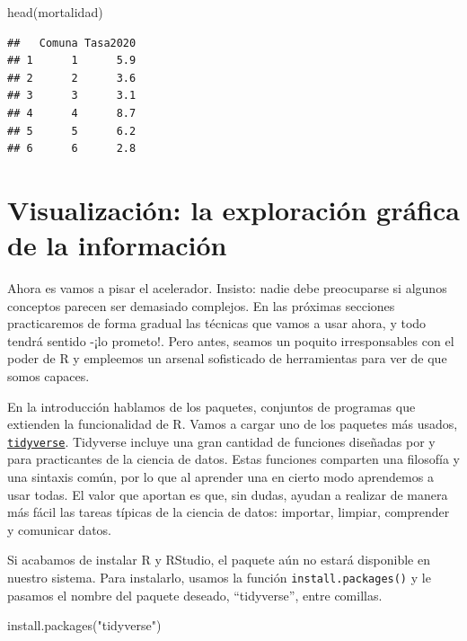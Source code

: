 \documentclass[
]{book}
\newenvironment{Shaded}{\begin{snugshade}}{\end{snugshade}}
\newcommand{\FunctionTok}[1]{\textcolor[rgb]{0.00,0.00,0.00}{#1}}
\newcommand{\NormalTok}[1]{#1}
\newcommand{\StringTok}[1]{\textcolor[rgb]{0.31,0.60,0.02}{#1}}
\begin{document}
\begin{Shaded}
\begin{Highlighting}[]
\FunctionTok{head}\NormalTok{(mortalidad)}
\end{Highlighting}
\end{Shaded}

\begin{verbatim}
##   Comuna Tasa2020
## 1      1      5.9
## 2      2      3.6
## 3      3      3.1
## 4      4      8.7
## 5      5      6.2
## 6      6      2.8
\end{verbatim}

\hypertarget{visualizaciuxf3n-la-exploraciuxf3n-gruxe1fica-de-la-informaciuxf3n}{%
\section{Visualización: la exploración gráfica de la información}\label{visualizaciuxf3n-la-exploraciuxf3n-gruxe1fica-de-la-informaciuxf3n}}

Ahora es vamos a pisar el acelerador. Insisto: nadie debe preocuparse si algunos conceptos parecen ser demasiado complejos. En las próximas secciones practicaremos de forma gradual las técnicas que vamos a usar ahora, y todo tendrá sentido -¡lo prometo!. Pero antes, seamos un poquito irresponsables con el poder de R y empleemos un arsenal sofisticado de herramientas para ver de que somos capaces.

En la introducción hablamos de los paquetes, conjuntos de programas que extienden la funcionalidad de R. Vamos a cargar uno de los paquetes más usados, \href{https://www.tidyverse.org/}{\texttt{tidyverse}}. Tidyverse incluye una gran cantidad de funciones diseñadas por y para practicantes de la ciencia de datos. Estas funciones comparten una filosofía y una sintaxis común, por lo que al aprender una en cierto modo aprendemos a usar todas. El valor que aportan es que, sin dudas, ayudan a realizar de manera más fácil las tareas típicas de la ciencia de datos: importar, limpiar, comprender y comunicar datos.

Si acabamos de instalar R y RStudio, el paquete aún no estará disponible en nuestro sistema. Para instalarlo, usamos la función \texttt{install.packages()} y le pasamos el nombre del paquete deseado, ``tidyverse'', entre comillas.

\begin{Shaded}
\begin{Highlighting}[]
\FunctionTok{install.packages}\NormalTok{(}\StringTok{"tidyverse"}\NormalTok{)}
\end{Highlighting}
\end{Shaded}
\end{document}
